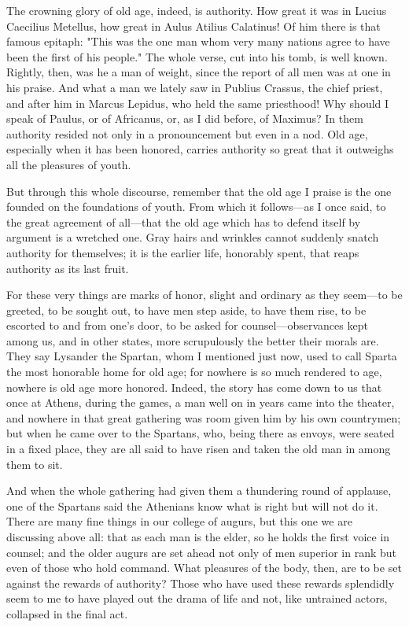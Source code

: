  The crowning glory of old age, indeed, is authority. How great it was in Lucius Caecilius Metellus, how great in Aulus Atilius Calatinus! Of him there is that famous epitaph: "This was the one man whom very many nations agree to have been the first of his people." The whole verse, cut into his tomb, is well known. Rightly, then, was he a man of weight, since the report of all men was at one in his praise. And what a man we lately saw in Publius Crassus, the chief priest, and after him in Marcus Lepidus, who held the same priesthood! Why should I speak of Paulus, or of Africanus, or, as I did before, of Maximus? In them authority resided not only in a pronouncement but even in a nod. Old age, especially when it has been honored, carries authority so great that it outweighs all the pleasures of youth.

 But through this whole discourse, remember that the old age I praise is the one founded on the foundations of youth. From which it follows—as I once said, to the great agreement of all—that the old age which has to defend itself by argument is a wretched one. Gray hairs and wrinkles cannot suddenly snatch authority for themselves; it is the earlier life, honorably spent, that reaps authority as its last fruit.

 For these very things are marks of honor, slight and ordinary as they seem—to be greeted, to be sought out, to have men step aside, to have them rise, to be escorted to and from one's door, to be asked for counsel—observances kept among us, and in other states, more scrupulously the better their morals are. They say Lysander the Spartan, whom I mentioned just now, used to call Sparta the most honorable home for old age; for nowhere is so much rendered to age, nowhere is old age more honored. Indeed, the story has come down to us that once at Athens, during the games, a man well on in years came into the theater, and nowhere in that great gathering was room given him by his own countrymen; but when he came over to the Spartans, who, being there as envoys, were seated in a fixed place, they are all said to have risen and taken the old man in among them to sit.

 And when the whole gathering had given them a thundering round of applause, one of the Spartans said the Athenians know what is right but will not do it. There are many fine things in our college of augurs, but this one we are discussing above all: that as each man is the elder, so he holds the first voice in counsel; and the older augurs are set ahead not only of men superior in rank but even of those who hold command. What pleasures of the body, then, are to be set against the rewards of authority? Those who have used these rewards splendidly seem to me to have played out the drama of life and not, like untrained actors, collapsed in the final act.

